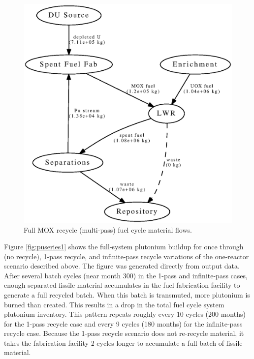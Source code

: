 \begin{figure}[H]
\begin{center}
\includegraphics{./images/flow-closed-1.eps}
\end{center}
\caption{Full \gls{MOX} recycle (multi-pass) fuel cycle material flows.}
\label{fig:flowclosed}
\end{figure}

Figure \ref{fig:puseries1} shows the full-system plutonium buildup for once
through (no recycle), 1-pass recycle, and infinite-pass recycle variations of
the one-reactor scenario described above. The figure was generated directly
from \Cyclus output data. After several batch cycles (near month 300) in the
1-pass and infinite-pass cases, enough separated fissile material accumulates
in the fuel fabrication facility to generate a full recycled batch.  When this
batch is transmuted, more plutonium is burned than created.  This results in a
drop in the total fuel cycle system plutonium inventory.  This pattern repeats
roughly every 10 cycles (200 months) for the 1-pass recycle case and every 9
cycles (180 months) for the infinite-pass recycle case.  Because the 1-pass
recycle scenario does not re-recycle material, it takes the fabrication
facility 2 cycles longer to accumulate a full batch of fissile material.

